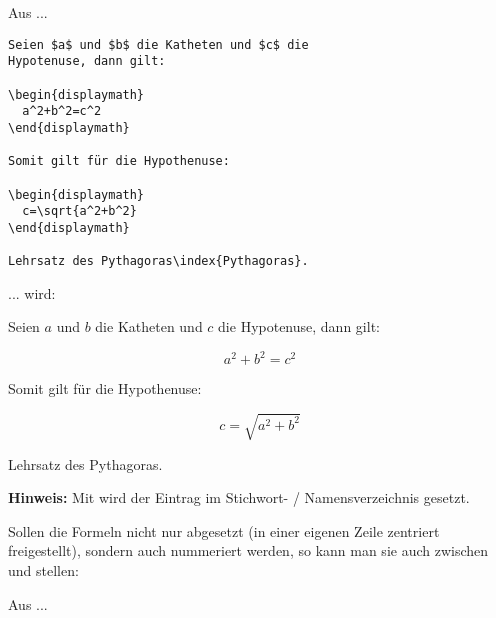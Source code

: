 Aus ...

\begin{tcolorbox}[width=\textwidth,colback={light-gray},title={Latex-Text},colbacktitle=gray,coltitle=white]

\begin{verbatim}
Seien $a$ und $b$ die Katheten und $c$ die
Hypotenuse, dann gilt: 

\begin{displaymath}
  a^2+b^2=c^2 
\end{displaymath}
 
Somit gilt für die Hypothenuse: 

\begin{displaymath}
  c=\sqrt{a^2+b^2} 
\end{displaymath}

Lehrsatz des Pythagoras\index{Pythagoras}. 
\end{verbatim}

\end{tcolorbox}

... wird:

\begin{tcolorbox}[width=\textwidth,colback={light-gray},title={Print-Text},colbacktitle=gray,coltitle=white]

Seien $a$ und $b$ die Katheten und $c$ die
Hypotenuse, dann gilt: 

\begin{displaymath}
  a^2+b^2=c^2 
\end{displaymath}
 
Somit gilt für die Hypothenuse: 

\begin{displaymath}
  c=\sqrt{a^2+b^2} 
\end{displaymath}

Lehrsatz des Pythagoras.  

\end{tcolorbox}

\textbf{Hinweis:} Mit wird der Eintrag im Stichwort- / Namensverzeichnis gesetzt.


\pagebreak 
Sollen die Formeln nicht nur abgesetzt (in einer eigenen Zeile zentriert freigestellt), sondern auch nummeriert werden, so kann man sie auch zwischen  und  stellen:

Aus ...

